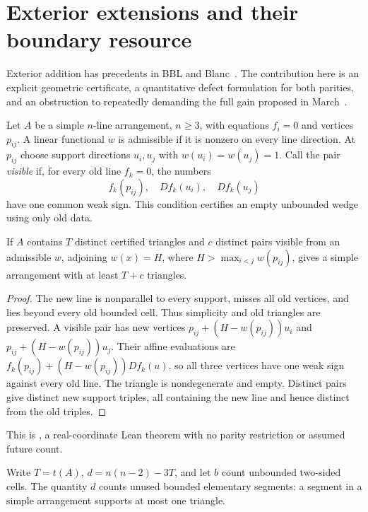 \section{Exterior extensions and their boundary resource}
\label{jext:section}

Exterior addition has precedents in BBL and Blanc~\cite{bbl2008,blanc2011}.
The contribution here is an explicit geometric certificate, a quantitative
defect formulation for both parities, and an obstruction to repeatedly
demanding the full gain proposed in March~\cite{zarzuelo2026}.

Let $A$ be a simple $n$-line arrangement, $n\ge3$, with equations $f_i=0$ and
vertices $p_{ij}$.  A linear functional $w$ is admissible if it is nonzero
on every line direction.  At $p_{ij}$ choose support directions $u_i,u_j$
with $w(u_i)=w(u_j)=1$.  Call the pair \emph{visible} if, for every old
line $f_k=0$, the numbers
\[
 f_k(p_{ij}),\quad Df_k(u_i),\quad Df_k(u_j)
\]
have one common weak sign.  This condition certifies an empty unbounded
wedge using only old data.

\begin{theorem}
\label{jext:visible}
If $A$ contains $T$ distinct certified triangles and $c$ distinct pairs
visible from an admissible $w$, adjoining $w(x)=H$, where
$H>\max_{i<j}w(p_{ij})$, gives a simple arrangement with at least $T+c$
triangles.
\end{theorem}
\begin{proof}
The new line is nonparallel to every support, misses all old vertices,
and lies beyond every old bounded cell.  Thus simplicity and old triangles
are preserved.  A visible pair has new vertices
$p_{ij}+(H-w(p_{ij}))u_i$ and $p_{ij}+(H-w(p_{ij}))u_j$.
Their affine evaluations are
$f_k(p_{ij})+(H-w(p_{ij}))Df_k(u)$, so all three vertices have one weak
sign against every old line.  The triangle is nondegenerate and empty.
Distinct pairs give distinct new support triples, all containing the
new line and hence distinct from the old triples.
\end{proof}
This is , a real-coordinate Lean theorem with
no parity restriction or assumed future count.

Write $T=t(A)$, $d=n(n-2)-3T$, and let $b$ count unbounded two-sided cells.
The quantity $d$ counts unused bounded elementary segments: a segment
in a simple arrangement supports at most one triangle.

